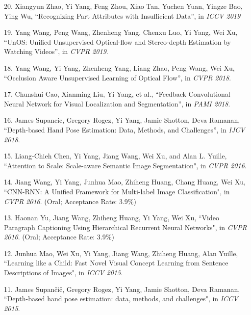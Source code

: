 \documentclass[margin]{res3}
\newenvironment{list1}{
  \begin{list}{\ding{113}}{%
      \setlength{\itemsep}{0.03in}
      \setlength{\parsep}{0in} \setlength{\parskip}{0in}
      \setlength{\topsep}{0in} \setlength{\partopsep}{0in}
      \setlength{\leftmargin}{0in}}}{\end{list}}
\begin{document}
\begin{resume}
\begin{list1}
\item[] 20. Xiangyun Zhao, Yi Yang, Feng Zhou, Xiao Tan, Yuchen Yuan, Yingze Bao, Ying Wu,
``Recognizing Part Attributes with Insufficient Data'',
  in \textit{ICCV 2019}

\item[] 19. Yang Wang, Peng Wang, Zhenheng Yang, Chenxu Luo, Yi Yang, Wei Xu, 
``UnOS: Unified Unsupervised Optical-flow and Stereo-depth Estimation by Watching Videos'',
in \textit{CVPR 2019}.

\item[] 18. Yang Wang, Yi Yang, Zhenheng Yang, Liang Zhao, Peng Wang, Wei Xu,
``Occlusion Aware Unsupervised Learning of Optical Flow'',
in \textit{CVPR 2018}.

\item[] 17. Chunshui Cao, Xianming Liu, Yi Yang, et al.,
``Feedback Convolutional Neural Network for Visual Localization and Segmentation'',
in \textit{PAMI 2018}.

\item[] 16. James Supancic, Gregory Rogez, Yi Yang, Jamie Shotton, Deva Ramanan,
``Depth-based Hand Pose Estimation: Data, Methods, and Challenges'',
in \textit{IJCV 2018}.

\item[] 15. Liang-Chieh Chen, Yi Yang, Jiang Wang, Wei Xu, and Alan L. Yuille, 
``Attention to Scale: Scale-aware Semantic Image Segmentation",
in \textit{CVPR 2016}.

\item[] 14. Jiang Wang, Yi Yang, Junhua Mao, Zhiheng Huang, Chang Huang, Wei Xu, 
``CNN-RNN: A Unified Framework for Multi-label Image Classification",
in \textit{CVPR 2016}. (Oral; Acceptance Rate: 3.9\%)

\item[] 13. Haonan Yu, Jiang Wang, Zhiheng Huang, Yi Yang, Wei Xu, 
``Video Paragraph Captioning Using Hierarchical Recurrent Neural Networks",
in \textit{CVPR 2016}. (Oral; Acceptance Rate: 3.9\%)

\item[] 12. Junhua Mao, Wei Xu, Yi Yang, Jiang Wang, Zhiheng Huang, Alan Yuille,
``Learning like a Child: Fast Novel Visual Concept Learning from Sentence Descriptions of Images",
in \textit{ICCV 2015}.

\item[] 11. James Supan\v{c}i\v{c}, Gregory Rogez, Yi Yang, Jamie Shotton, Deva Ramanan, 
``Depth-based hand pose estimation: data, methods, and challenges",
in \textit{ICCV 2015}.


\end{list1}
\end{resume}
\end{document}
